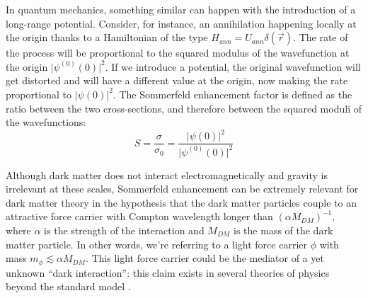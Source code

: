 In quantum mechanics, something similar can happen with the introduction of a long-range potential. Consider, for instance, an annihilation happening locally at the origin thanks to a Hamiltonian of the type \(H_{ann} = U_{ann} \delta (\vec{r})\). The rate of the process will be proportional to the squared modulus of the wavefunction at the origin \(\vert \psi ^{(0)}(0) \vert^2 \). If we introduce a potential, the original wavefunction will get distorted and will have a different value at the origin, now making the rate proportional to \(\vert \psi (0) \vert^2 \). The Sommerfeld enhancement factor is defined as the ratio between the two cross-sections, and therefore between the squared moduli of the wavefunctions:
\begin{equation}\label{eq:sommerfeld_def}
	S = \frac{\sigma }{\sigma _0} = \frac{\vert \psi (0) \vert ^2}{\vert \psi ^{(0)}(0) \vert ^2}
\end{equation}

Although dark matter does not interact electromagnetically and gravity is irrelevant at these scales, Sommerfeld enhancement can be extremely relevant for dark matter theory in the hypothesis that the dark matter particles couple to an attractive force carrier with Compton wavelength longer than \((\alpha M_{DM})^{-1} \), where \(\alpha\) is the strength of the interaction and \(M_{DM} \) is the mass of the dark matter particle. In other words, we're referring to a light force carrier \(\phi \) with mass \(m_{\phi } \lesssim \alpha M_{DM} \). This light force carrier could be the mediator of a yet unknown ``dark interaction'': this claim exists in several theories of physics beyond the standard model \cite{Arkani_2009}.

